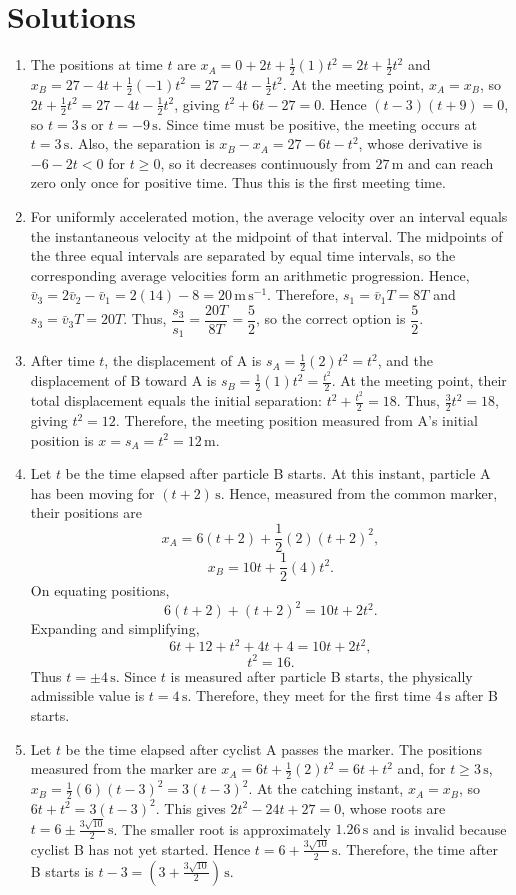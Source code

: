 \documentclass[11pt,a4paper]{article}
\begin{document}
\section*{Solutions}
\begin{enumerate}
\item The positions at time $t$ are $x_A=0+2t+\frac12(1)t^2=2t+\frac12t^2$ and $x_B=27-4t+\frac12(-1)t^2=27-4t-\frac12t^2$. At the meeting point, $x_A=x_B$, so $2t+\frac12t^2=27-4t-\frac12t^2$, giving $t^2+6t-27=0$. Hence $(t-3)(t+9)=0$, so $t=3\,\text{s}$ or $t=-9\,\text{s}$. Since time must be positive, the meeting occurs at $t=3\,\text{s}$. Also, the separation is $x_B-x_A=27-6t-t^2$, whose derivative is $-6-2t<0$ for $t\geq0$, so it decreases continuously from $27\,\text{m}$ and can reach zero only once for positive time. Thus this is the first meeting time.
\item For uniformly accelerated motion, the average velocity over an interval equals the instantaneous velocity at the midpoint of that interval. The midpoints of the three equal intervals are separated by equal time intervals, so the corresponding average velocities form an arithmetic progression. Hence, $\bar v_3=2\bar v_2-\bar v_1=2(14)-8=20\,\mathrm{m\,s^{-1}}$. Therefore, $s_1=\bar v_1T=8T$ and $s_3=\bar v_3T=20T$. Thus, $\dfrac{s_3}{s_1}=\dfrac{20T}{8T}=\dfrac{5}{2}$, so the correct option is $\dfrac{5}{2}$.
\item After time $t$, the displacement of A is $s_A=\frac{1}{2}(2)t^2=t^2$, and the displacement of B toward A is $s_B=\frac{1}{2}(1)t^2=\frac{t^2}{2}$. At the meeting point, their total displacement equals the initial separation: $t^2+\frac{t^2}{2}=18$. Thus, $\frac{3}{2}t^2=18$, giving $t^2=12$. Therefore, the meeting position measured from A's initial position is $x=s_A=t^2=12\,\text{m}$.
\item Let $t$ be the time elapsed after particle B starts. At this instant, particle A has been moving for $(t+2)\,\text{s}$. Hence, measured from the common marker, their positions are
\[
x_A=6(t+2)+\frac12(2)(t+2)^2,
\]
\[
x_B=10t+\frac12(4)t^2.
\]
On equating positions,
\[
6(t+2)+(t+2)^2=10t+2t^2.
\]
Expanding and simplifying,
\[
6t+12+t^2+4t+4=10t+2t^2,
\]
\[
t^2=16.
\]
Thus $t=\pm4\,\text{s}$. Since $t$ is measured after particle B starts, the physically admissible value is $t=4\,\text{s}$. Therefore, they meet for the first time $4\,\text{s}$ after B starts.
\item Let $t$ be the time elapsed after cyclist A passes the marker. The positions measured from the marker are $x_A=6t+\frac{1}{2}(2)t^2=6t+t^2$ and, for $t\geq 3\,\mathrm{s}$, $x_B=\frac{1}{2}(6)(t-3)^2=3(t-3)^2$. At the catching instant, $x_A=x_B$, so $6t+t^2=3(t-3)^2$. This gives $2t^2-24t+27=0$, whose roots are $t=6\pm\frac{3\sqrt{10}}{2}\,\mathrm{s}$. The smaller root is approximately $1.26\,\mathrm{s}$ and is invalid because cyclist B has not yet started. Hence $t=6+\frac{3\sqrt{10}}{2}\,\mathrm{s}$. Therefore, the time after B starts is $t-3=\left(3+\frac{3\sqrt{10}}{2}\right)\,\mathrm{s}$.

\end{enumerate}
\end{document}
